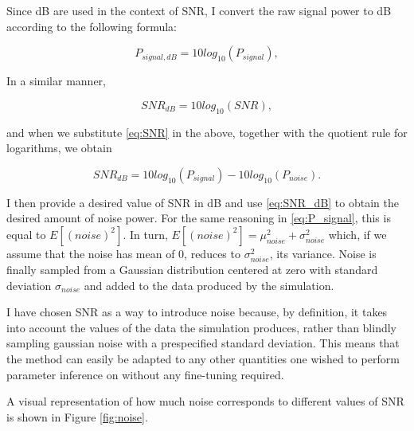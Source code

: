 \documentclass[bsc,frontabs,singlespacing,parskip,deptreport]{infthesis}
\begin{document}
Since dB are used in the context of SNR, I convert the raw signal power to dB according to the following formula:

\begin{equation}
    P_{signal, dB} = 10log_{10}(P_{signal}),
\end{equation}

In a similar manner, 

\begin{equation}
    SNR_{dB} = 10log_{10}(SNR),
\end{equation}

and when we substitute \ref{eq:SNR} in the above, together with the quotient rule for logarithms, we obtain

\begin{equation}\label{eq:SNR_dB}
    SNR_{dB} = 10log_{10}(P_{signal}) - 10log_{10}(P_{noise}).
\end{equation}

I then provide a desired value of SNR in dB and use \ref{eq:SNR_dB} to obtain the desired amount of noise power. For the same reasoning in \ref{eq:P_signal}, this is equal to $E[(noise)^{2}]$. In turn, $E[(noise)^{2}] = \mu_{noise}^{2} + \sigma_{noise}^{2}$ \cite{durrett2019probability} which, if we assume that the noise has mean of 0, reduces to $\sigma_{noise}^{2}$, its variance. Noise is finally sampled from a Gaussian distribution centered at zero with standard deviation $\sigma_{noise}$ and added to the data produced by the simulation.

I have chosen SNR as a way to introduce noise because, by definition, it takes into account the values of the data the simulation produces, rather than blindly sampling gaussian noise with a prespecified standard deviation. This means that the method can easily be adapted to any other quantities one wished to perform parameter inference on without any fine-tuning required.

A visual representation of how much noise corresponds to different values of SNR is shown in Figure \ref{fig:noise}.
\end{document}
